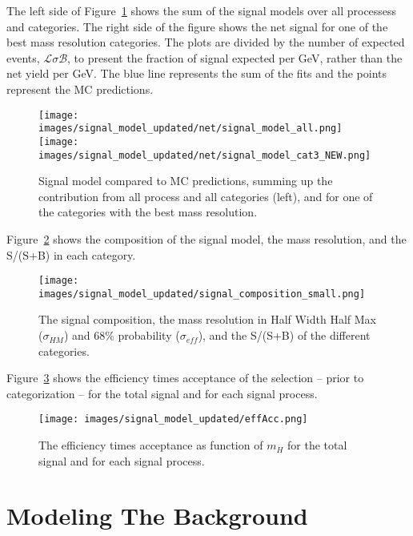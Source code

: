 The left side of Figure~\ref{sigmodel:all} shows the sum of the signal models over all processess and categories. The right side of the figure shows the net signal for one of the best mass resolution categories. The plots are divided by the number of expected events, $\mathcal{L}\sigma\mathcal{B}$, to present the fraction of signal expected per GeV, rather than the net yield per GeV. The blue line represents the sum of the fits and the points represent the MC predictions. 
\begin{figure}[h!]
    \centering
    \texttt{[image: images/signal\_model\_updated/net/signal\_model\_all.png]}
    \texttt{[image: images/signal\_model\_updated/net/signal\_model\_cat3\_NEW.png]}
    \caption[The signal model compared to MC predictions.]
    {Signal model compared to MC predictions, summing up the contribution from all process and all categories (left), and for one of the categories with the best mass resolution.}
    \label{sigmodel:all}
\end{figure}
Figure~\ref{sigmodel:comp} shows the composition of the signal model, the mass resolution, and the S/(S+B) in each category.
\begin{figure}[h!]
    \centering
    \texttt{[image: images/signal\_model\_updated/signal\_composition\_small.png]}
    \caption[The signal composition, resolution, and purity in the different categories.]
    {The signal composition, the mass resolution in Half Width Half Max ($\sigma_{HM}$) and 68\% probability ($\sigma_{eff}$), and the S/(S+B) of the different categories.}
    \label{sigmodel:comp}
\end{figure}
Figure~\ref{sigmodel:effacc} shows the efficiency times acceptance of the selection --  prior to categorization -- for the total signal and for each signal process.
\begin{figure}[h!]
    \texttt{[image: images/signal\_model\_updated/effAcc.png]}
    \caption[The efficiency times acceptance versus the Higgs mass.]
    {The efficiency times acceptance as function of $m_H$ for the total signal and for each signal process.}
    \label{sigmodel:effacc}
\end{figure}
\section{Modeling The Background}

